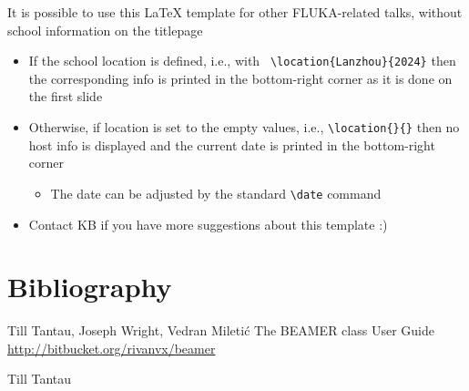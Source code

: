 \documentclass[aspectratio=169]{beamer}
\begin{document}
\begin{frame}{\secname}
{     It is possible to use this \LaTeX\xspace template for other FLUKA-related talks, without school information on the titlepage
     \begin{itemize}
       \item If the school location is defined, i.e., with {\tt
         \textbackslash location\{Lanzhou\}\{2024\}} then the
         corresponding info is printed in the bottom-right corner as
         it is done on the first slide
       \item Otherwise, if location is set to the empty values, i.e.,
         {\tt \textbackslash location\{\}\{\}} then no host info is
         displayed and the current date is printed in the bottom-right
         corner
         \begin{itemize}
         \item The date can be adjusted by the standard {\tt \textbackslash date} command
         \end{itemize}
       \item Contact KB if you have more suggestions about this template :)
     \end{itemize}

   }
 \end{frame}

 \section{Bibliography}
 \begin{frame}{\secname}
   \begin{thebibliography}{3}
     \beamertemplatearticlebibitems
     Till Tantau, Joseph Wright, Vedran Mileti\'c
     \newblock The BEAMER class User Guide
     \newblock \href{http://bitbucket.org/rivanvx/beamer}{http://bitbucket.org/rivanvx/beamer}

     \beamertemplatebookbibitems
     Till Tantau
   \end{thebibliography}
 \end{frame}

 \finalpage
\end{document}
